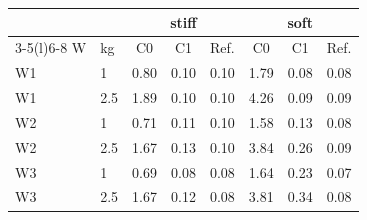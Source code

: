 \begin{tabular}{@{}llcccccc@{}}
\toprule
 & & \multicolumn{3}{c}{stiff} & \multicolumn{3}{c}{soft}\\
\cmidrule(lr){3-5}\cmidrule(l){6-8}
W & kg & C0 & C1 & Ref. & C0 & C1 & Ref.\\
\midrule
W1 & 1 & 0.80 & 0.10 & 0.10 & 1.79 & 0.08 & 0.08\\
W1 & 2.5 & 1.89 & 0.10 & 0.10 & 4.26 & 0.09 & 0.09\\
W2 & 1 & 0.71 & 0.11 & 0.10 & 1.58 & 0.13 & 0.08\\
W2 & 2.5 & 1.67 & 0.13 & 0.10 & 3.84 & 0.26 & 0.09\\
W3 & 1 & 0.69 & 0.08 & 0.08 & 1.64 & 0.23 & 0.07\\
W3 & 2.5 & 1.67 & 0.12 & 0.08 & 3.81 & 0.34 & 0.08\\
\bottomrule
\end{tabular}
